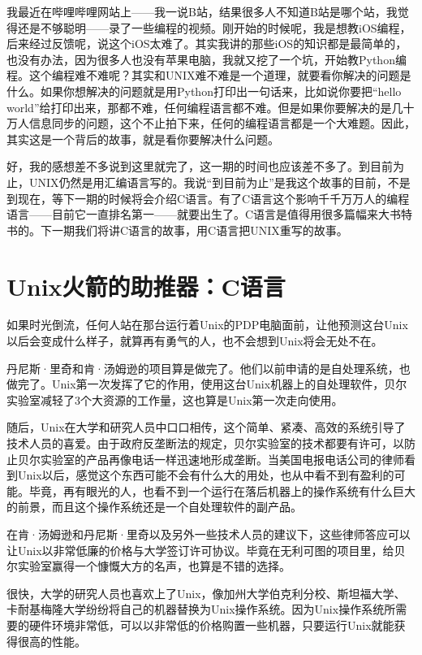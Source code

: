 \documentclass[
  letterpaper,
  DIV=11,
  numbers=noendperiod]{scrreprt}
\begin{document}
我最近在哔哩哔哩网站上------我一说B站，结果很多人不知道B站是哪个站，我觉得还是不够聪明------录了一些编程的视频。刚开始的时候呢，我是想教iOS编程，后来经过反馈呢，说这个iOS太难了。其实我讲的那些iOS的知识都是最简单的，也没有办法，因为很多人也没有苹果电脑，我就又挖了一个坑，开始教Python编程。这个编程难不难呢？其实和UNIX难不难是一个道理，就要看你解决的问题是什么。如果你想解决的问题就是用Python打印出一句话来，比如说你要把``hello
world''给打印出来，那都不难，任何编程语言都不难。但是如果你要解决的是几十万人信息同步的问题，这个不止拍下来，任何的编程语言都是一个大难题。因此，其实这是一个背后的故事，就是看你要解决什么问题。

好，我的感想差不多说到这里就完了，这一期的时间也应该差不多了。到目前为止，UNIX仍然是用汇编语言写的。我说``到目前为止''是我这个故事的目前，不是到现在，等下一期的时候将会介绍C语言。有了C语言这个影响千千万万人的编程语言------目前它一直排名第一------就要出生了。C语言是值得用很多篇幅来大书特书的。下一期我们将讲C语言的故事，用C语言把UNIX重写的故事。


\chapter{Unix火箭的助推器：C语言}\label{unixux706bux7badux7684ux52a9ux63a8ux5668cux8bedux8a00}

如果时光倒流，任何人站在那台运行着Unix的PDP电脑面前，让他预测这台Unix以后会变成什么样子，就算再有勇气的人，也不会想到Unix将会无处不在。

丹尼斯·里奇和肯·汤姆逊的项目算是做完了。他们以前申请的是自处理系统，也做完了。Unix第一次发挥了它的作用，使用这台Unix机器上的自处理软件，贝尔实验室减轻了3个大资源的工作量，这也算是Unix第一次走向使用。

随后，Unix在大学和研究人员中口口相传，这个简单、紧凑、高效的系统引导了技术人员的喜爱。由于政府反垄断法的规定，贝尔实验室的技术都要有许可，以防止贝尔实验室的产品再像电话一样迅速地形成垄断。当美国电报电话公司的律师看到Unix以后，感觉这个东西可能不会有什么大的用处，也从中看不到有盈利的可能。毕竟，再有眼光的人，也看不到一个运行在落后机器上的操作系统有什么巨大的前景，而且这个操作系统还是一个自处理软件的副产品。

在肯·汤姆逊和丹尼斯·里奇以及另外一些技术人员的建议下，这些律师答应可以让Unix以非常低廉的价格与大学签订许可协议。毕竟在无利可图的项目里，给贝尔实验室赢得一个慷慨大方的名声，也算是不错的选择。

很快，大学的研究人员也喜欢上了Unix，像加州大学伯克利分校、斯坦福大学、卡耐基梅隆大学纷纷将自己的机器替换为Unix操作系统。因为Unix操作系统所需要的硬件环境非常低，可以以非常低的价格购置一些机器，只要运行Unix就能获得很高的性能。
\end{document}
